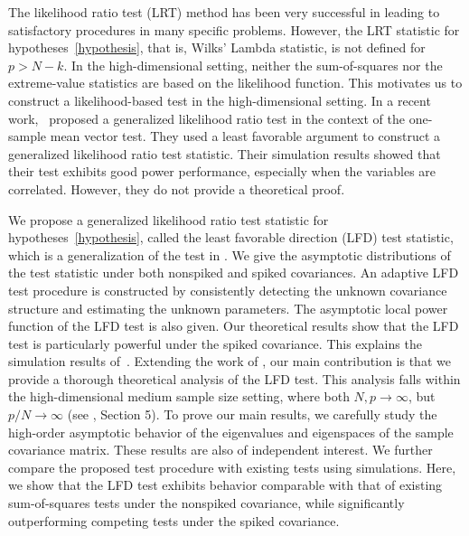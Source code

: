 \documentclass[12pt]{article} %
\theoremstyle{definition}
\begin{document}
   The likelihood ratio test (LRT) method has been very successful in leading to satisfactory procedures in many specific problems.
    However, the LRT statistic for hypotheses~\eqref{hypothesis}, that is, Wilks' Lambda statistic, is not defined for $p>N-k$.
   In the high-dimensional setting, neither the sum-of-squares nor the extreme-value statistics are based on the likelihood function.
    This motivates us to construct a likelihood-based test in the high-dimensional setting.
    In a recent work,~\cite{Zhao2016A} proposed a generalized likelihood ratio test in the context of the one-sample mean vector test.
    They used a least favorable argument to construct a generalized likelihood ratio test statistic.
    Their simulation results showed that their test exhibits good power performance, especially when the variables are correlated.
    However, they do not provide a theoretical proof.


    We propose a generalized likelihood ratio test statistic for hypotheses~\eqref{hypothesis}, called the least favorable direction (LFD) test statistic, which is a generalization of the test in \cite{Zhao2016A}.
    We give the asymptotic distributions of the test statistic under both nonspiked and spiked covariances.
    An adaptive LFD test procedure is constructed by consistently detecting the unknown covariance structure and estimating the unknown parameters.
    The asymptotic local power function of the LFD test is also given.
    Our theoretical results show that the LFD test is particularly powerful under the spiked covariance.
    This explains the simulation results of~\cite{Zhao2016A}.
    Extending the work of \cite{Zhao2016A}, our main contribution is that we provide a thorough theoretical analysis of the LFD test.
    This analysis falls within the high-dimensional medium sample size setting, where both $N,p\to \infty$, but $p/N\to \infty$ (see \cite{aoshima2018A}, Section 5).
    To prove our main results, we carefully study the high-order asymptotic behavior of the eigenvalues and eigenspaces of the sample covariance matrix.
    These results are also of independent interest.
    We further compare the proposed test procedure with existing tests using simulations.
    Here, we show that the LFD test exhibits behavior comparable with that of existing sum-of-squares tests under the nonspiked covariance, while significantly outperforming competing tests under the spiked covariance.
\end{document}
